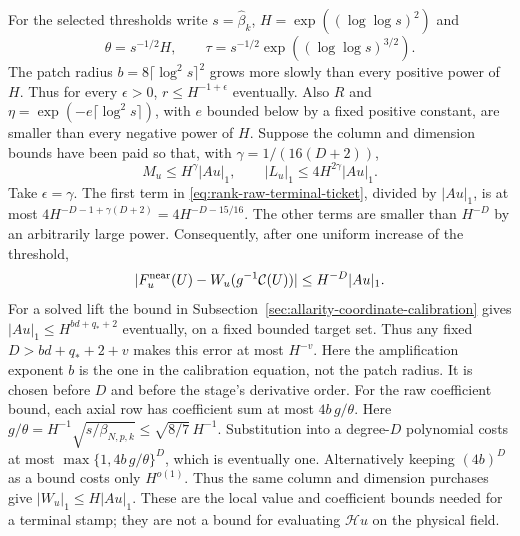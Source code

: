 For the selected thresholds write $s=\widehat\beta_k$,
$H=\exp((\log\log s)^2)$ and
\[
 \theta=s^{-1/2}H,\qquad
 \tau=s^{-1/2}\exp((\log\log s)^{3/2}).
\]
The patch radius $b=8\lceil\log^2s\rceil^2$ grows more slowly than
every positive power of $H$. Thus for every $\epsilon>0$,
$r\le H^{-1+\epsilon}$ eventually. Also $R$ and
$\eta=\exp(-e\lceil\log^2s\rceil)$, with $e$ bounded below by a
fixed positive constant, are smaller than every negative power of
$H$. Suppose the column and dimension bounds have been paid so that,
with $\gamma=1/(16(D+2))$,
\[
 M_u\le H^\gamma|Au|_1,\qquad
 |L_u|_1\le4H^{2\gamma}|Au|_1.
\]
Take $\epsilon=\gamma$. The first term in
\eqref{eq:rank-raw-terminal-ticket}, divided by $|Au|_1$, is at most
$4H^{-D-1+\gamma(D+2)}=4H^{-D-15/16}$.
The other terms are smaller than $H^{-D}$ by an arbitrarily large
power. Consequently, after one uniform increase of the threshold,
\begin{equation}\label{eq:rank-raw-terminal-paid}
 |F_u^{\rm near}(U)-W_u(g^{-1}\mathcal C(U))|
                         \le H^{-D}|Au|_1.
\end{equation}
For a solved lift the bound in
Subsection~\ref{sec:allarity-coordinate-calibration} gives
$|Au|_1\le H^{bd+q_*+2}$ eventually, on a fixed bounded target set.
Thus any fixed $D>bd+q_*+2+v$ makes this error at most $H^{-v}$.
Here the amplification exponent $b$ is the one in the calibration
equation, not the patch radius. It is chosen before $D$ and before
the stage's derivative order. For the raw coefficient bound, each axial
row has coefficient sum at most $4b\,g/\theta$. Here
$g/\theta=H^{-1}\sqrt{s/\beta_{N,p,k}}\le\sqrt{8/7}\,H^{-1}$.
Substitution into a degree-$D$ polynomial costs at most
$\max\{1,4b\,g/\theta\}^D$, which is eventually one. Alternatively
keeping $(4b)^D$ as a bound costs only $H^{o(1)}$. Thus the same
column and dimension purchases give $|W_u|_1\le H|Au|_1$. These are the local value and coefficient bounds
needed for a terminal stamp; they are not a bound for evaluating
$\mathcal H u$ on the physical field.

